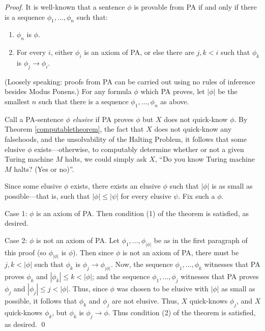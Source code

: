 \documentclass[runningheads]{llncs}
\begin{document}
\begin{proof}
  It is well-known that a sentence $\phi$ is provable from PA if and only
  if there is a sequence $\phi_1,\ldots,\phi_n$ such that:
  \begin{enumerate}
    \item $\phi_n$ is $\phi$.
    \item For every $i$, either $\phi_i$ is an axiom of PA, or else there
    are $j,k<i$ such that $\phi_k$ is $\phi_j\rightarrow \phi_i$.
  \end{enumerate}
  (Loosely speaking: proofs from PA can be carried out using no rules
  of inference besides Modus Ponens.)
  For any formula $\phi$ which PA proves, let $|\phi|$ be the smallest
  $n$ such that there is a sequence $\phi_1,\ldots,\phi_n$ as above.

  Call a PA-sentence $\phi$ \emph{elusive} if PA proves $\phi$ but $X$ does not
  quick-know $\phi$. By Theorem \ref{computabletheorem}, the fact that $X$ does
  not quick-know any falsehoods, and the unsolvability of the Halting Problem,
  it follows that some elusive $\phi$ exists---otherwise, to computably determine whether
  or not a given Turing machine $M$ halts, we could simply ask $X$, ``Do you know
  Turing machine $M$ halts? (Yes or no)''.

  Since some elusive $\phi$ exists, there exists an elusive $\phi$ such that $|\phi|$
  is as small as possible---that is, such that $|\phi|\leq |\psi|$ for every
  elusive $\psi$. Fix such a $\phi$.

  Case 1: $\phi$ is an axiom of PA. Then condition (1) of the theorem is
  satisfied, as desired.

  Case 2: $\phi$ is not an axiom of PA.
  Let $\phi_1,\ldots,\phi_{|\phi|}$ be as in the first paragraph of this proof
  (so $\phi_{|\phi|}$ is $\phi$).
  Then since $\phi$ is not an axiom of PA,
  there must be $j,k<|\phi|$ such that $\phi_k$ is $\phi_j\rightarrow \phi_{|\phi|}$.
  Now, the sequence $\phi_1,\ldots,\phi_k$ witnesses that PA
  proves $\phi_k$ and $|\phi_k|\leq k<|\phi|$; and the
  sequence $\phi_1,\ldots,\phi_j$ witnesses that PA proves
  $\phi_j$ and $|\phi_j|\leq j<|\phi|$.
  Thus, since $\phi$ was chosen to be elusive with $|\phi|$ as small as possible,
  it follows that $\phi_k$ and $\phi_j$ are not elusive.
  Thus, $X$ quick-knows $\phi_j$, and $X$ quick-knows $\phi_k$,
  but $\phi_k$ is $\phi_j\rightarrow\phi$. Thus condition (2) of the theorem is
  satisfied, as desired.
  \qed
\end{proof}
\end{document}
